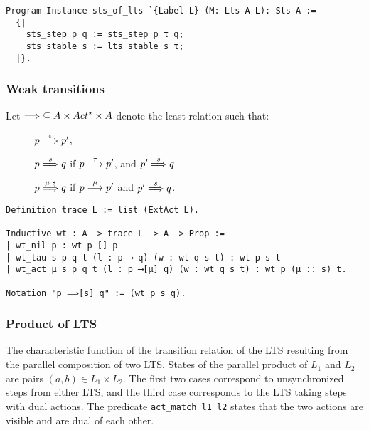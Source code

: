 \begin{mdframed}
\begin{verbatim}
Program Instance sts_of_lts `{Label L} (M: Lts A L): Sts A :=
  {|
    sts_step p q := sts_step p τ q;
    sts_stable s := lts_stable s τ;
  |}.
\end{verbatim}
\end{mdframed}

\subsubsection{Weak transitions}

Let ${\wt{}} \subseteq \States \times \Actfin \times \States$ denote the least relation such that:
  \begin{description}
  \item[] $p \mathrel{\overset{\varepsilon} \Longrightarrow} p'$,
  \item[] $p \mathrel{\overset{ s } \Longrightarrow} q$ if $p \mathrel{\overset{\tau}\longrightarrow} p'$,
    and $p' \mathrel{\overset{ s } \Longrightarrow} q$
  \item[]  $p \mathrel{\overset{\mu.s} \Longrightarrow} q$ if $p \mathrel{\overset{\mu}\longrightarrow} p'$
    and $p' \mathrel{\overset{s} \Longrightarrow} q$.
  \end{description}


\begin{mdframed}
\begin{verbatim}
Definition trace L := list (ExtAct L).

Inductive wt : A -> trace L -> A -> Prop :=
| wt_nil p : wt p [] p
| wt_tau s p q t (l : p ⟶ q) (w : wt q s t) : wt p s t
| wt_act μ s p q t (l : p ⟶[μ] q) (w : wt q s t) : wt p (μ :: s) t.

Notation "p ⟹[s] q" := (wt p s q).
\end{verbatim}
\end{mdframed}

\subsubsection{Product of LTS}

The characteristic function of the transition relation of the
LTS resulting from the parallel composition of two LTS.
%
States of the parallel product of $L_1$ and $L_2$ are pairs $(a, b) \in L_1
\times L_2$.
%
The first two cases correspond to unsynchronized steps from either LTS, and the
third case corresponds to the LTS taking steps with dual actions. The predicate
\lstinline|act_match l1 l2| states that the two actions are visible and are dual
of each other.

